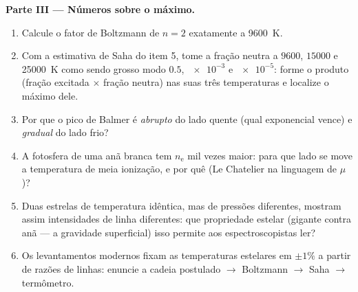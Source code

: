 \begin{problem}
\medskip\noindent\textbf{Parte III --- Números sobre o máximo.}
\begin{enumerate}[resume]
  \item Calcule o fator de Boltzmann de $n = 2$ exatamente a
        \qty{9600}{K}.
  \item Com a estimativa de Saha do item 5, tome a fração neutra
        a $9600$, $15000$ e \qty{25000}{K} como sendo
        grosso modo $0.5$, $\num{e-3}$ e $\num{e-5}$: forme o produto
        (fração excitada $\times$ fração neutra) nas suas três
        temperaturas e localize o máximo dele.
  \item Por que o pico de Balmer é \emph{abrupto} do lado quente
        (qual exponencial vence) e \emph{gradual} do lado
        frio?
  \item A fotosfera de uma anã branca tem $n_{\text{e}}$ mil
        vezes maior: para que lado se move a temperatura de meia
        ionização, e por quê (Le Chatelier na linguagem de $\mu$)?
  \item Duas estrelas de temperatura idêntica, mas de pressões
        diferentes, mostram assim intensidades de linha diferentes: que
        propriedade estelar (gigante contra anã --- a gravidade
        superficial) isso permite aos espectroscopistas ler?
  \item Os levantamentos modernos fixam as temperaturas estelares em
        $\pm1\%$ a partir de razões de linhas: enuncie a cadeia
        postulado $\to$ Boltzmann $\to$ Saha $\to$ termômetro.
\end{enumerate}


\end{problem}
